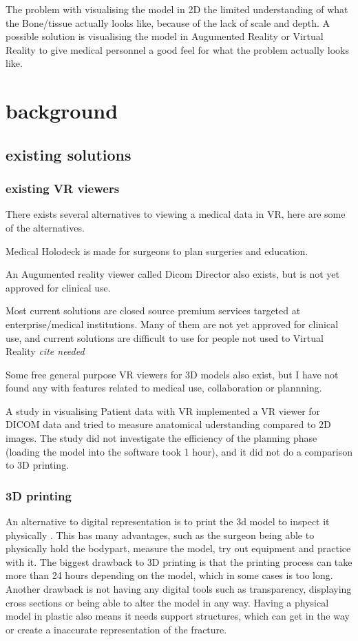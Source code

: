 \documentclass[11pt]{scrartcl}
\begin{document}
The problem with visualising the model in 2D the limited understanding of what
the Bone/tissue actually looks like, because of the lack of scale and depth. A
possible solution is visualising the model in Augumented Reality or Virtual
Reality to give medical personnel a good feel for what the problem actually looks like. 

\section{ background } 

\subsection{ existing solutions}

\subsubsection{existing VR viewers}
There exists several alternatives to viewing a medical data in VR, here are some of the alternatives.

Medical Holodeck \cite{holodeck} is made for surgeons to plan surgeries and education.

An Augumented reality viewer called Dicom Director also exists, but is not yet approved for clinical use. \cite{dicomdirector} 

Most current solutions are closed source premium services targeted at enterprise/medical institutions. Many of them are not yet approved for clinical use, and current solutions are difficult to use for people not used to Virtual Reality \emph{cite needed}


Some free general purpose VR viewers for 3D models also exist, but I have not found any with features related to medical use, collaboration or plannning.

A study in visualising Patient data with VR \cite{vertemati_virtual_2019} implemented a VR viewer for DICOM data and tried to measure anatomical uderstanding compared to 2D images. The study did not investigate the efficiency of the planning phase (loading the model into the software took 1 hour), and it did not do a comparison to 3D printing.

\subsubsection { 3D printing }

An alternative to digital representation is to print the 3d model to inspect it physically \cite{virtualplanningand3dprinting}. This has many advantages, such as the surgeon being able to physically hold the bodypart, measure the model, try out equipment and practice with it.
The biggest drawback to 3D printing is that the printing process can take more than 24 hours depending on the model, which in some cases is too long. Another drawback is not having any digital tools such as transparency, displaying cross sections or being able to alter the model in any way. Having a physical model in plastic also means it needs support structures, which can get in the way or create a inaccurate representation of the fracture.
\end{document}
